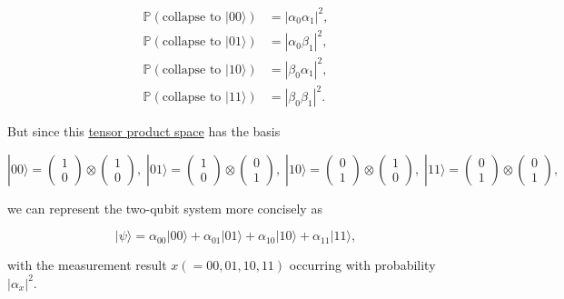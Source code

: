 \documentclass{article}
\newcounter{example}[section]
\begin{document}
\begin{example}
      \begin{align*}
        \mathbb{P}(\text{collapse to } |00\rangle) & = |\alpha_0 \alpha_1|^2, \\
        \mathbb{P}(\text{collapse to } |01\rangle) & = |\alpha_0 \beta_1|^2, \\
        \mathbb{P}(\text{collapse to } |10\rangle) & = |\beta_0 \alpha_1|^2, \\
        \mathbb{P}(\text{collapse to } |11\rangle) & = |\beta_0 \beta_1|^2.
      \end{align*}

      But since this \hyperref[lin-def:tensor]{tensor product space} has the basis

      \begin{equation}
        |00\rangle = \begin{pmatrix} 1 \\ 0 \end{pmatrix} \otimes \begin{pmatrix} 1 \\ 0 \end{pmatrix}, \;
        |01\rangle = \begin{pmatrix} 1 \\ 0 \end{pmatrix} \otimes \begin{pmatrix} 0 \\ 1 \end{pmatrix}, \;
        |10\rangle = \begin{pmatrix} 0 \\ 1 \end{pmatrix} \otimes \begin{pmatrix} 1 \\ 0 \end{pmatrix}, \;
        |11\rangle = \begin{pmatrix} 0 \\ 1 \end{pmatrix} \otimes \begin{pmatrix} 0 \\ 1 \end{pmatrix},
      \end{equation}

      we can represent the two-qubit system more concisely as

        \begin{equation}
          |\psi \rangle = \alpha_{00} |00\rangle + \alpha_{01} |01\rangle + \alpha_{10} |10\rangle + \alpha_{11} |11\rangle,
        \end{equation}

      with the measurement result $x ( = 00, 01, 10, 11)$ occurring with probability $|\alpha_{x}|^2$.
    \end{example}
\end{document}
